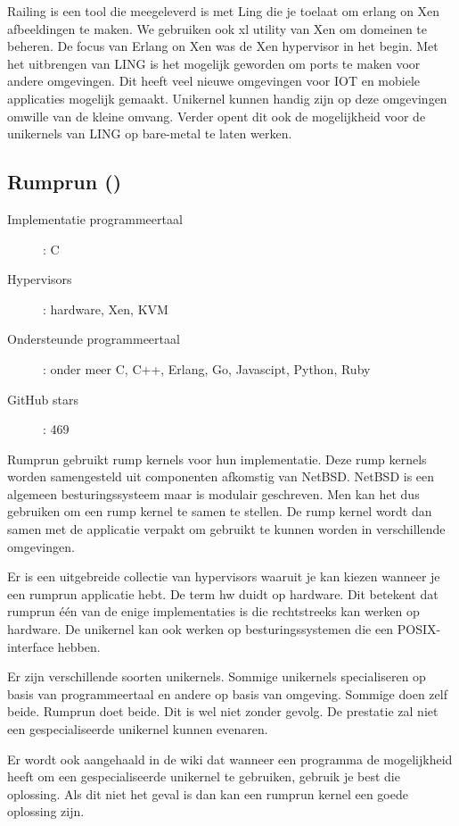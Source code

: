 \documentclass[pdftex,a4paper,12pt,twoside]{report}
\begin{document}
Railing is een tool die meegeleverd is met Ling die je toelaat om erlang on Xen afbeeldingen te maken. We gebruiken ook xl utility van Xen om domeinen te beheren.
De focus van Erlang on Xen was de Xen hypervisor in het begin. Met het uitbrengen van LING is het mogelijk geworden om ports te maken voor andere omgevingen. Dit heeft veel nieuwe omgevingen voor IOT en mobiele applicaties mogelijk gemaakt.
Unikernel kunnen handig zijn op deze omgevingen omwille van de kleine omvang. Verder opent dit ook de mogelijkheid voor de unikernels van LING op bare-metal te laten werken.

\subsection{Rumprun (\cite{rumpkernel/rumprun_0000})}

\begin{description}
  \item [Implementatie programmeertaal]: C
  \item [Hypervisors]: hardware, Xen, KVM
  \item [Ondersteunde programmeertaal]: onder meer C, C++, Erlang, Go, Javascipt, Python, Ruby
  \item [GitHub stars]: 469
\end{description}

Rumprun gebruikt rump kernels voor hun implementatie. Deze rump kernels worden samengesteld uit componenten afkomstig van NetBSD. NetBSD is een algemeen besturingssysteem maar is modulair geschreven.
Men kan het dus gebruiken om een rump kernel te samen te stellen. De rump kernel wordt dan samen met de applicatie verpakt om gebruikt te kunnen worden in verschillende omgevingen.

Er is een uitgebreide collectie van hypervisors waaruit je kan kiezen wanneer je een rumprun applicatie hebt. De term hw duidt op hardware. Dit betekent dat rumprun één van de enige implementaties is die rechtstreeks kan werken op hardware. De unikernel kan ook werken op besturingssystemen die een POSIX-interface hebben.

Er zijn verschillende soorten unikernels. Sommige unikernels specialiseren op basis van programmeertaal en andere op basis van omgeving. Sommige doen zelf beide. Rumprun doet beide. Dit is wel niet zonder gevolg. De prestatie zal niet een gespecialiseerde unikernel kunnen evenaren.

Er wordt ook aangehaald in de wiki dat wanneer een programma de mogelijkheid heeft om een gespecialiseerde unikernel te gebruiken, gebruik je best die oplossing. Als dit niet het geval is dan kan een rumprun kernel een goede oplossing zijn.
\end{document}
